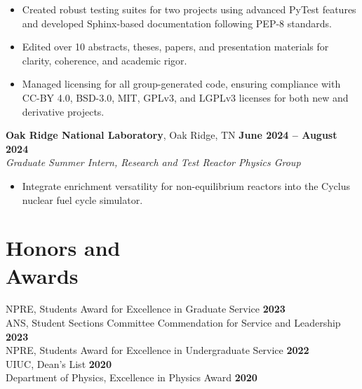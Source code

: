 \documentclass[margin,line]{resume}
\begin{document}
\begin{resume}
\begin{itemize}
                    \item Created robust testing suites for two projects using advanced PyTest features and developed Sphinx-based documentation following PEP-8 standards.
                    \item Edited over 10 abstracts, theses, papers, and presentation materials for clarity, coherence, and academic rigor.
                    \item Managed licensing for all group-generated code, ensuring compliance with CC-BY 4.0, BSD-3.0, MIT, GPLv3, and LGPLv3 licenses for both new and derivative projects.
                \end{itemize}

    \textbf{Oak Ridge National Laboratory}, Oak Ridge, TN \hfill \textbf{June 2024 -- August 2024} \\
    \textsl{Graduate Summer Intern, Research and Test Reactor Physics Group} \\
    \begin{itemize}
        \item Integrate enrichment versatility for non-equilibrium reactors into the Cyclus nuclear fuel cycle simulator.
    \end{itemize}


    \section{\mysidestyle Honors and\\Awards}
                NPRE, Students Award for Excellence in Graduate Service \hfill \textbf{2023}\vspace{.5mm}\\%
                ANS, Student Sections Committee Commendation for Service and Leadership \hfill \textbf{2023}\vspace{.5mm}\\%
                NPRE, Students Award for Excellence in Undergraduate Service \hfill \textbf{2022}\vspace{.5mm}\\%
                UIUC, Dean's List \hfill \textbf{2020}\vspace{.5mm}\\%
                Department of Physics, Excellence in Physics Award \hfill \textbf{2020}\vspace{.5mm}\\%
    \vspace{-4mm}

\end{resume}
\end{document}
